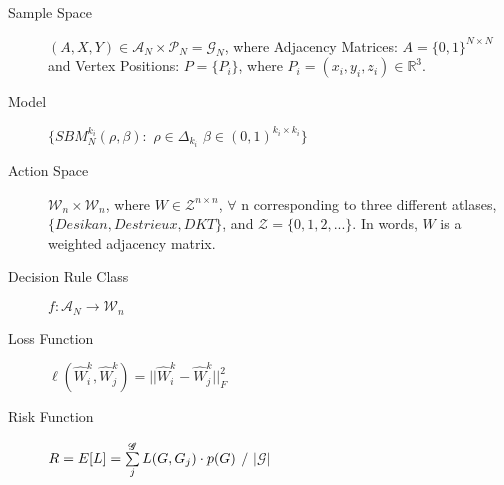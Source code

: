 \documentclass[12pt]{article}
\begin{document}
\begin{description}

\item[Sample Space] $(A, X, Y) \in \mathcal{A}_N \times \mathcal{P}_N = \mathscr{G}_N $, where 
 Adjacency Matrices: $A = \{0,1\}^{N \times N}$
and
Vertex Positions: $P= \{P_i\}$, where $P_i = (x_i,y_i,z_i) \in \mathbb{R}^3$.

\item[Model]
$  
\{SBM^{k_i}_N (\rho, \beta):$ 
$\rho \in \Delta_{k_i}$ 
$\beta \in (0,1)^{k_i \times k_i} \}$

\item[Action Space]

$ \mathcal{W}_{n} \times \mathcal{W}_{n}$, where 
$W \in \mathcal{Z}^{n \times n}$, 
$\forall$ n corresponding to three different atlases,
$\{Desikan, {Destrieux}, {DKT}\}$, and $\mathcal{Z} = \{0,1,2,...\}$.  In words, $W$ is a weighted adjacency matrix.

\item[Decision Rule Class]
$ f: \mathcal{A}_N \to \mathcal{W}_n$

\item[Loss Function]
$ \ell(\hat{W}^k_i, \hat{W}^k_j) = \lvert \lvert \hat{W}^k_i - \hat{W}^k_j \rvert \rvert^2_F$



\item[Risk Function]
$ \\ R = E[L] = \sum\limits_{j}^{\mathscr{G}} L(G, G_j) \cdot p(G)$ $/$ $\lvert \mathscr{G} \rvert$

\end{description}
\end{document}
